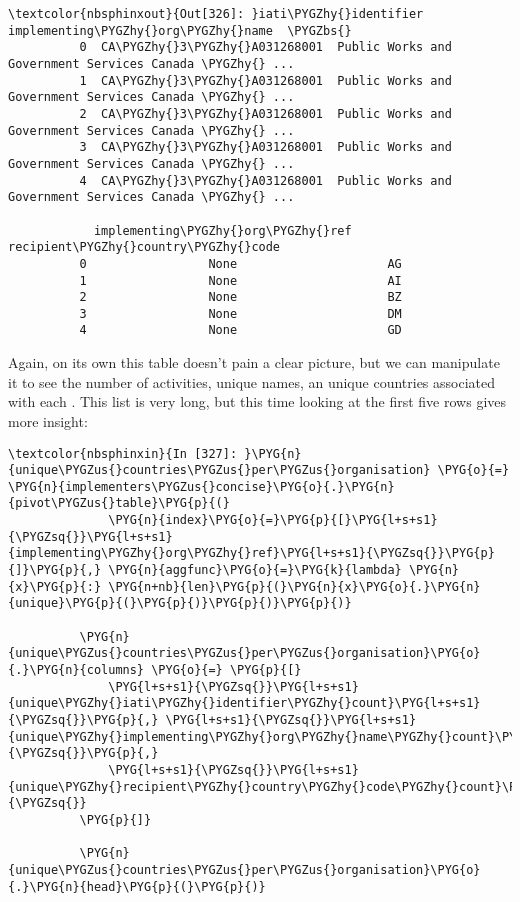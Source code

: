 \documentclass[letterpaper,10pt,english]{sphinxmanual}
\begin{document}
\begin{Verbatim}[commandchars=\\\{\}]
\textcolor{nbsphinxout}{Out[326]: }iati\PYGZhy{}identifier                              implementing\PYGZhy{}org\PYGZhy{}name  \PYGZbs{}
          0  CA\PYGZhy{}3\PYGZhy{}A031268001  Public Works and Government Services Canada \PYGZhy{} ...
          1  CA\PYGZhy{}3\PYGZhy{}A031268001  Public Works and Government Services Canada \PYGZhy{} ...
          2  CA\PYGZhy{}3\PYGZhy{}A031268001  Public Works and Government Services Canada \PYGZhy{} ...
          3  CA\PYGZhy{}3\PYGZhy{}A031268001  Public Works and Government Services Canada \PYGZhy{} ...
          4  CA\PYGZhy{}3\PYGZhy{}A031268001  Public Works and Government Services Canada \PYGZhy{} ...
          
            implementing\PYGZhy{}org\PYGZhy{}ref recipient\PYGZhy{}country\PYGZhy{}code
          0                 None                     AG
          1                 None                     AI
          2                 None                     BZ
          3                 None                     DM
          4                 None                     GD
\end{Verbatim}

Again, on its own this table doesn't pain a clear picture, but we can
manipulate it to see the number of activities, unique names, an unique
countries associated with each . This list is very
long, but this time looking at the first five rows gives more insight:

\begin{Verbatim}[commandchars=\\\{\}]
\textcolor{nbsphinxin}{In [327]: }\PYG{n}{unique\PYGZus{}countries\PYGZus{}per\PYGZus{}organisation} \PYG{o}{=} \PYG{n}{implementers\PYGZus{}concise}\PYG{o}{.}\PYG{n}{pivot\PYGZus{}table}\PYG{p}{(}
              \PYG{n}{index}\PYG{o}{=}\PYG{p}{[}\PYG{l+s+s1}{\PYGZsq{}}\PYG{l+s+s1}{implementing\PYGZhy{}org\PYGZhy{}ref}\PYG{l+s+s1}{\PYGZsq{}}\PYG{p}{]}\PYG{p}{,} \PYG{n}{aggfunc}\PYG{o}{=}\PYG{k}{lambda} \PYG{n}{x}\PYG{p}{:} \PYG{n+nb}{len}\PYG{p}{(}\PYG{n}{x}\PYG{o}{.}\PYG{n}{unique}\PYG{p}{(}\PYG{p}{)}\PYG{p}{)}\PYG{p}{)}
          
          \PYG{n}{unique\PYGZus{}countries\PYGZus{}per\PYGZus{}organisation}\PYG{o}{.}\PYG{n}{columns} \PYG{o}{=} \PYG{p}{[}
              \PYG{l+s+s1}{\PYGZsq{}}\PYG{l+s+s1}{unique\PYGZhy{}iati\PYGZhy{}identifier\PYGZhy{}count}\PYG{l+s+s1}{\PYGZsq{}}\PYG{p}{,} \PYG{l+s+s1}{\PYGZsq{}}\PYG{l+s+s1}{unique\PYGZhy{}implementing\PYGZhy{}org\PYGZhy{}name\PYGZhy{}count}\PYG{l+s+s1}{\PYGZsq{}}\PYG{p}{,}
              \PYG{l+s+s1}{\PYGZsq{}}\PYG{l+s+s1}{unique\PYGZhy{}recipient\PYGZhy{}country\PYGZhy{}code\PYGZhy{}count}\PYG{l+s+s1}{\PYGZsq{}}
          \PYG{p}{]}
          
          \PYG{n}{unique\PYGZus{}countries\PYGZus{}per\PYGZus{}organisation}\PYG{o}{.}\PYG{n}{head}\PYG{p}{(}\PYG{p}{)}
\end{Verbatim}
\end{document}
